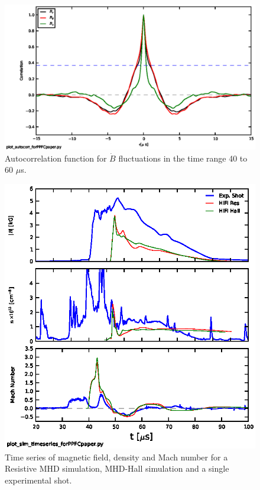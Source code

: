 \documentclass[12pt]{iopart}
\begin{document}
\begin{figure}[!htbp]
\centerline{
\includegraphics[width=16cm]{autocorr.eps}}
\caption{\label{fig:autocorr} Autocorrelation function for $\dot{B}$ fluctuations in the time range 40 to 60 $\mu$s.}
\end{figure}
\begin{figure}[!htbp]
\centerline{
\includegraphics[width=16cm]{simtimeseries64.eps}}
\caption{\label{fig:simtimeseries64} Time series of magnetic field, density and Mach number for a Resistive MHD simulation, MHD-Hall simulation and a single experimental shot.}
\end{figure}
\end{document}
